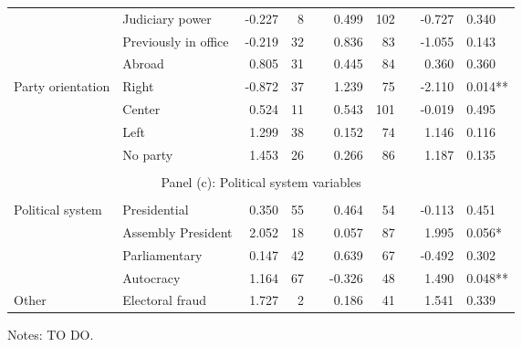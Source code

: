 \begin{table}[h!]
{\begin{threeparttable}
\begin{tabular}{llrrlrrlrl}
& Judiciary power      & -0.227 & 8   &  & 0.499  & 102 &  & -0.727 & 0.340                                                          \\
& Previously in office & -0.219 & 32  &  & 0.836  & 83  &  & -1.055 & 0.143                                                          \\
& Abroad               & 0.805  & 31  &  & 0.445  & 84  &  & 0.360  & 0.360                                                          \\ [1.2ex]%
Party orientation                                                                  & Right                & -0.872 & 37  &  & 1.239  & 75  &  & -2.110 & 0.014**                                                        \\
& Center               & 0.524  & 11  &  & 0.543  & 101 &  & -0.019 & 0.495                                                          \\
& Left                 & 1.299  & 38  &  & 0.152  & 74  &  & 1.146  & 0.116                                                          \\
& No party             & 1.453  & 26  &  & 0.266  & 86  &  & 1.187  & 0.135                                                          \\ %
 \\[-1.8ex]
\multicolumn{10}{c}{Panel (c): Political system variables}                                                                                                                                                              \\
\\[-1.8ex]
Political system                                                                   & Presidential         & 0.350  & 55  &  & 0.464  & 54  &  & -0.113 & 0.451                                                          \\
& Assembly President   & 2.052  & 18  &  & 0.057  & 87  &  & 1.995  & 0.056*                                                         \\
& Parliamentary         & 0.147  & 42  &  & 0.639  & 67  &  & -0.492 & 0.302                                                          \\
& Autocracy            & 1.164  & 67  &  & -0.326 & 48  &  & 1.490  & 0.048**                                                        \\ [1.2ex]%
Other                                                                              & Electoral fraud      & 1.727  & 2   &  & 0.186  & 41  &  & 1.541  & 0.339                                                         	
	                                                                                              \\ \hline \hline
\end{tabular}
\begin{tablenotes}
	\footnotesize{Notes: TO DO.}
\end{tablenotes}
\end{threeparttable}
}
\end{table}